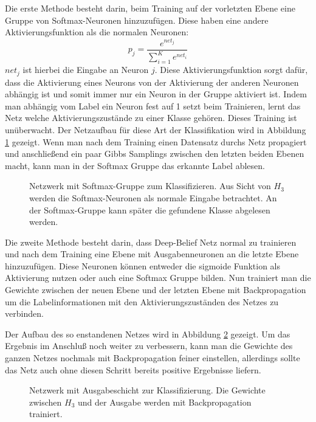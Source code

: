 \documentclass[12pt]{article}
\begin{document}
Die erste Methode besteht darin, beim Training auf der vorletzten Ebene eine Gruppe von Softmax-Neuronen hinzuzufügen. Diese haben eine andere Aktivierungsfunktion als die normalen Neuronen: 
\begin{equation}
p_j = \frac{e^{net_j}}{\sum_{i=1}^K e^{net_i}}
\end{equation}
$net_j$ ist hierbei die Eingabe an Neuron $j$.
Diese Aktivierungsfunktion sorgt dafür, dass die Aktivierung eines Neurons von der Aktivierung der anderen Neuronen abhängig ist und somit immer nur ein Neuron in der Gruppe aktiviert ist. Indem man abhängig vom Label ein Neuron fest auf 1 setzt beim Trainieren, lernt das Netz welche Aktivierungszustände zu einer Klasse gehören. Dieses Training ist unüberwacht. Der Netzaufbau für diese Art der Klassifikation wird in Abbildung \ref{SMTrain} gezeigt. Wenn man nach dem Training einen Datensatz durchs Netz propagiert und anschließend ein paar Gibbs Samplings zwischen den letzten beiden Ebenen macht, kann man in der Softmax Gruppe das erkannte Label ablesen.
\begin{figure}[H]
	\center
	
	\caption{Netzwerk mit Softmax-Gruppe zum Klassifizieren. Aus Sicht von $H_3$ werden die Softmax-Neuronen als normale Eingabe betrachtet. An der Softmax-Gruppe kann später die gefundene Klasse abgelesen werden.}
	\label{SMTrain}
\end{figure}

Die zweite Methode besteht darin, dass Deep-Belief Netz normal zu trainieren und nach dem Training eine Ebene mit Ausgabenneuronen an die letzte Ebene hinzuzufügen. Diese Neuronen können entweder die sigmoide Funktion als Aktivierung nutzen oder auch eine Softmax Gruppe bilden. Nun trainiert man die Gewichte zwischen der neuen Ebene und der letzten Ebene mit Backpropagation um die Labelinformationen mit den Aktivierungszuständen des Netzes zu verbinden. 

Der Aufbau des so enstandenen Netzes wird in Abbildung \ref{BPTrain} gezeigt. Um das Ergebnis im Anschluß noch weiter zu verbessern, kann man die Gewichte des ganzen Netzes nochmals mit Backpropagation feiner einstellen, allerdings sollte das Netz auch ohne diesen Schritt bereits positive Ergebnisse liefern\cite{backprop}.

\begin{figure}[H]
	\center
	
	\caption{Netzwerk mit Ausgabeschicht zur Klassifizierung. Die Gewichte zwischen $H_3$ und der Ausgabe werden mit Backpropagation trainiert.}
	\label{BPTrain}
\end{figure}
\end{document}
